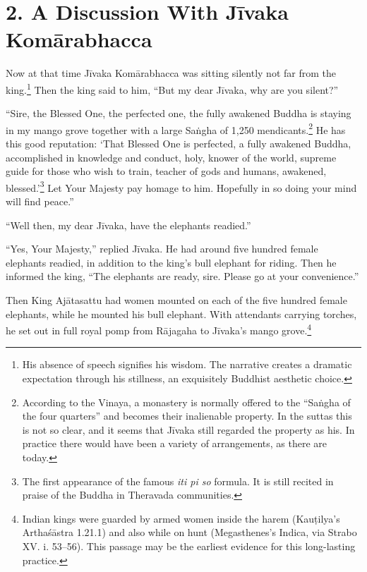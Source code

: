 \documentclass[12pt,openany]{book}%
\begin{document}
\section*{2. A Discussion With \textsanskrit{Jīvaka} \textsanskrit{Komārabhacca} }

Now at that time \textsanskrit{Jīvaka} \textsanskrit{Komārabhacca} was sitting silently not far from the king.\footnote{His absence of speech signifies his wisdom. The narrative creates a dramatic expectation through his stillness, an exquisitely Buddhist aesthetic choice. } Then the king said to him, “But my dear \textsanskrit{Jīvaka}, why are you silent?” 

“Sire, the Blessed One, the perfected one, the fully awakened Buddha is staying in my mango grove together with a large \textsanskrit{Saṅgha} of 1,250 mendicants.\footnote{According to the Vinaya, a monastery is normally offered to the “\textsanskrit{Saṅgha} of the four quarters” and becomes their inalienable property. In the suttas this is not so clear, and it seems that \textsanskrit{Jīvaka} still regarded the property as his. In practice there would have been a variety of arrangements, as there are today. } He has this good reputation: ‘That Blessed One is perfected, a fully awakened Buddha, accomplished in knowledge and conduct, holy, knower of the world, supreme guide for those who wish to train, teacher of gods and humans, awakened, blessed.’\footnote{The first appearance of the famous \textit{iti pi so} formula. It is still recited in praise of the Buddha in Theravada communities. } Let Your Majesty pay homage to him. Hopefully in so doing your mind will find peace.” 

“Well then, my dear \textsanskrit{Jīvaka}, have the elephants readied.” 

“Yes, Your Majesty,” replied \textsanskrit{Jīvaka}. He had around five hundred female elephants readied, in addition to the king’s bull elephant for riding. Then he informed the king, “The elephants are ready, sire. Please go at your convenience.” 

Then King \textsanskrit{Ajātasattu} had women mounted on each of the five hundred female elephants, while he mounted his bull elephant. With attendants carrying torches, he set out in full royal pomp from \textsanskrit{Rājagaha} to \textsanskrit{Jīvaka}’s mango grove.\footnote{Indian kings were guarded by armed women inside the harem (\textsanskrit{Kauṭilya}’s \textsanskrit{Arthaśāstra} 1.21.1) and also while on hunt (Megasthenes’s Indica, via Strabo XV. i. 53–56). This passage may be the earliest evidence for this long-lasting practice. } 
\end{document}
